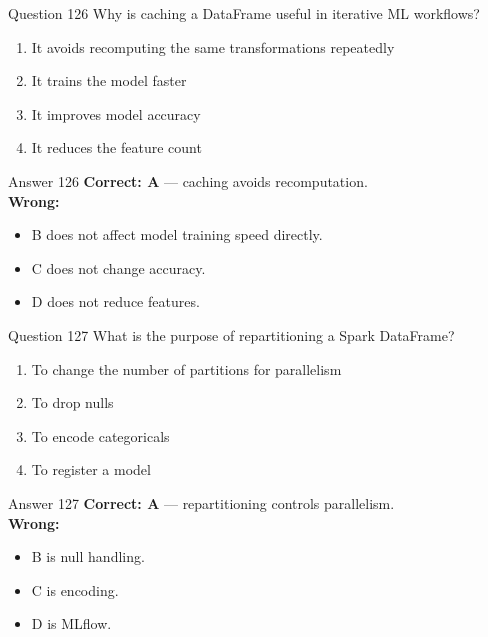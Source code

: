 \documentclass[aspectratio=169,11pt]{beamer}
\begin{document}
	\begin{frame}{Question 126}
		Why is caching a DataFrame useful in iterative ML workflows?
		\begin{enumerate}[label=\Alph*.]
			\item It avoids recomputing the same transformations repeatedly
			\item It trains the model faster
			\item It improves model accuracy
			\item It reduces the feature count
		\end{enumerate}
	\end{frame}
	\begin{frame}{Answer 126}
		\textbf{Correct: A} --- caching avoids recomputation.\\
		\vspace{0.5em}
		\textbf{Wrong:}
		\begin{itemize}
			\item B does not affect model training speed directly.
			\item C does not change accuracy.
			\item D does not reduce features.
		\end{itemize}
	\end{frame}
	
	\begin{frame}{Question 127}
		What is the purpose of repartitioning a Spark DataFrame?
		\begin{enumerate}[label=\Alph*.]
			\item To change the number of partitions for parallelism
			\item To drop nulls
			\item To encode categoricals
			\item To register a model
		\end{enumerate}
	\end{frame}
	\begin{frame}{Answer 127}
		\textbf{Correct: A} --- repartitioning controls parallelism.\\
		\vspace{0.5em}
		\textbf{Wrong:}
		\begin{itemize}
			\item B is null handling.
			\item C is encoding.
			\item D is MLflow.
		\end{itemize}
	\end{frame}
	
\end{document}
